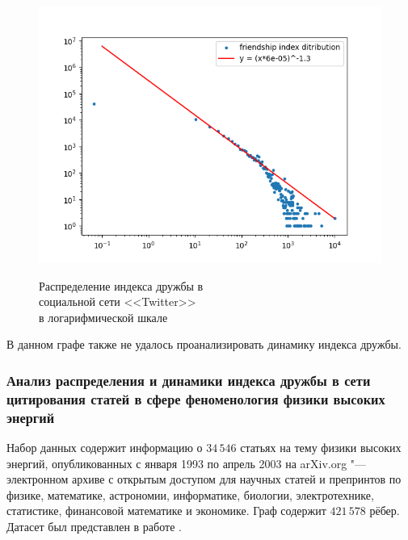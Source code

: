\documentclass[bachelor, och, diploma]{SCWorks}
\begin{document}
\begin{figure}[!ht]
\centering
\includegraphics[scale=0.7]{diploma_results/static_real_log/twitter_combined.png}\\
\caption{Распределение индекса дружбы  в\\ социальной сети <<Twitter>>\\ в логарифмической шкале}\label{fig:twit}
\end{figure}

В данном графе также не удалось проанализировать динамику индекса дружбы.

\subsubsection{Анализ распределения и динамики индекса дружбы в сети цитирования статей в сфере феноменология физики высоких энергий}
Набор данных содержит информацию о $34\,546$ статьях на тему физики высоких энергий, опубликованных с января 1993 по апрель 2003 на arXiv.org "--- электронном архиве с открытым доступом для научных статей и препринтов по физике, математике, астрономии, информатике, биологии, электротехнике, статистике, финансовой математике и экономике. Граф содержит $421\,578$ рёбер. Датасет был представлен в работе \cite{cit}.
\end{document}

